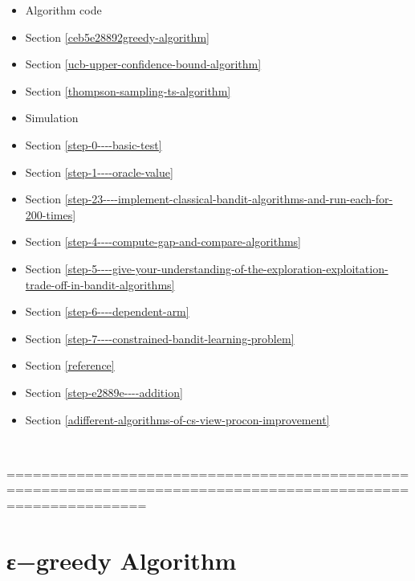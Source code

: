 \documentclass[11pt]{article}
\begin{document}
\begin{itemize}
\item
  Algorithm code
\item
  Section \ref{ceb5e28892greedy-algorithm}
\item
  Section \ref{ucb-upper-confidence-bound-algorithm}
\item
  Section \ref{thompson-sampling-ts-algorithm}
\item
  Simulation
\item
  Section \ref{step-0----basic-test}
\item
  Section \ref{step-1----oracle-value}
\item
  Section \ref{step-23----implement-classical-bandit-algorithms-and-run-each-for-200-times}
\item
  Section \ref{step-4----compute-gap-and-compare-algorithms}
\item
  Section \ref{step-5----give-your-understanding-of-the-exploration-exploitation-trade-off-in-bandit-algorithms}
\item
  Section \ref{step-6----dependent-arm}
\item
  Section \ref{step-7----constrained-bandit-learning-problem}
\item
  Section \ref{reference}
\item
  Section \ref{step-e2889e----addition}
\item
  Section \ref{adifferent-algorithms-of-cs-view-procon-improvement}
\end{itemize}

​

    ============================================================================================================

    \section{ε−greedy Algorithm}\label{ux3b5greedy-algorithm}
\end{document}
